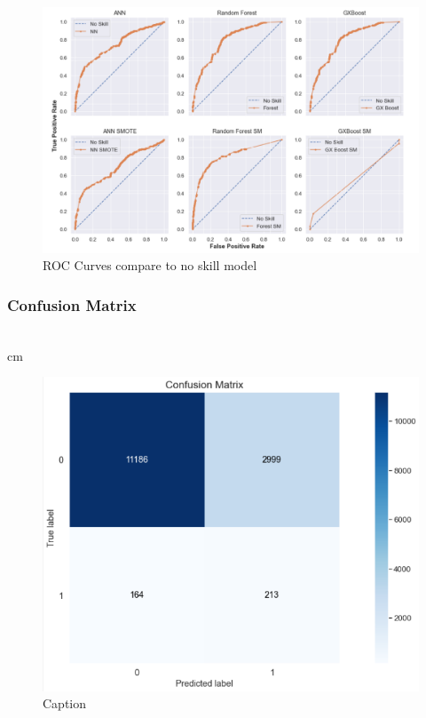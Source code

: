 \begin{figure}[H]
    \centering
    \includegraphics[width=\linewidth]{figures/roc_res_full.PNG}
    \caption{ROC Curves compare to no skill model}
    \label{fig:my_label}
\end{figure}


\subsubsection{Confusion Matrix}\hspace*{\fill} \\
cm
\begin{figure}[H]
    \centering
    \includegraphics[width=\linewidth]{figures/cm.PNG}
    \caption{Caption}
    \label{fig:my_label}
\end{figure}

